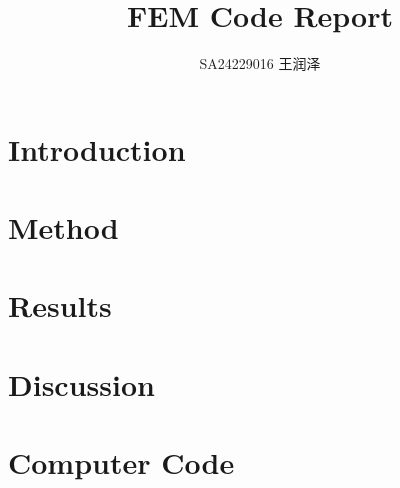 \documentclass[11pt]{ctexart}
\title{FEM Code Report}
\author{SA24229016 王润泽}
\begin{document}
\maketitle

\section{Introduction}


\section{Method}


\section{Results}


\section{Discussion}


\appendix
\section{Computer Code}
\end{document}
